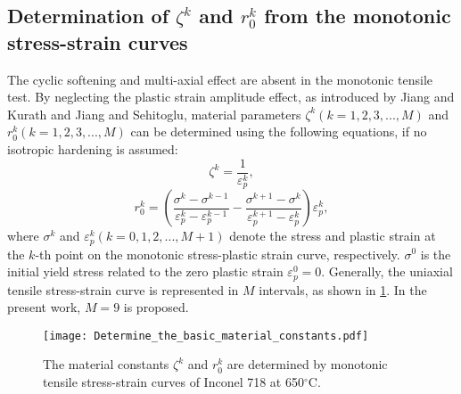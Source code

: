 \subsection{Determination of $\zeta^k$ and $r_0^k$ from the monotonic stress-strain curves}
The cyclic softening and multi-axial effect are absent in the monotonic tensile test.
By neglecting the plastic strain amplitude effect, as introduced by Jiang and Kurath\cite{Jiang1996387} and Jiang and Sehitoglu\cite{jiang1996modeling}, material parameters ${\zeta ^k}( k = 1,2,3,...,M )$ and $r_0^k( k = 1,2,3,...,M )$ can be determined using the following equations, if no isotropic hardening is assumed:
\begin{equation}
{\zeta ^k} = \frac{1}{{\varepsilon _p^k}},
\label{Eqn:zetak}
\end{equation}
\begin{equation}
r_0^k = \left( {\frac{{\sigma _{}^k - \sigma _{}^{k - 1}}}{{\varepsilon _p^k - \varepsilon _p^{k - 1}}} - \frac{{\sigma _{}^{k + 1} - \sigma _{}^k}}{{\varepsilon _p^{k + 1} - \varepsilon _p^k}}} \right)\varepsilon _p^k,
\end{equation}
where $\sigma^k$ and $\varepsilon_p^k( k = 0,1,2,...,M+1 )$ denote the stress and plastic strain at the $k$-th point on the monotonic  stress-plastic strain curve, respectively. $\sigma^0$ is the initial yield stress related to the zero plastic strain $\varepsilon_p^0=0$. Generally, the uniaxial tensile stress-strain curve is represented in $M$ intervals, as shown in \ref{Fig:Determine_the_basic_material_constants}. In the present work, $M=9$ is proposed.

\begin{figure}[!htp]
\centering
\texttt{[image: Determine\_the\_basic\_material\_constants.pdf]}
\caption{The material constants $\zeta^k$ and $r_0^k$ are determined by monotonic tensile stress-strain curves of Inconel 718 at 650$^{\circ}$C.}
\label{Fig:Determine_the_basic_material_constants}
\end{figure}

